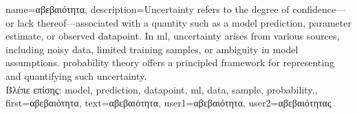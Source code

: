 
{name={\foreignlanguage{greek}{αβεβαιότητα}},
	description={Uncertainty refers to the degree of confidence—or 
		lack thereof—associated with a quantity such as a \gls{model} \gls{prediction}, parameter estimate, or 
		observed \gls{datapoint}. In \gls{ml}, uncertainty arises from various sources, including 
		noisy \gls{data}, limited training \gls{sample}s, or ambiguity in \gls{model} assumptions. \Gls{probability} theory 
		offers a principled framework for representing and quantifying such uncertainty.\\
		\foreignlanguage{greek}{Βλέπε επίσης:} \gls{model}, \gls{prediction}, \gls{datapoint}, \gls{ml}, \gls{data}, \gls{sample}, \gls{probability}.},
	first={\foreignlanguage{greek}{αβεβαιότητα}},
	text={\foreignlanguage{greek}{αβεβαιότητα}},
	user1={\foreignlanguage{greek}{αβεβαιότητα}}, %
  	user2={\foreignlanguage{greek}{αβεβαιότητας}} %
}

